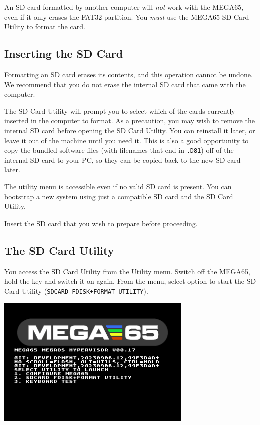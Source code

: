 An SD card formatted by another computer will {\em not} work with the MEGA65, even if it only erases the FAT32 partition. You {\em must} use the MEGA65 SD Card Utility to format the card.

\subsection{Inserting the SD Card}

Formatting an SD card erases its contents, and this operation cannot be undone. We recommend that you do not erase the internal SD card that came with the computer.

The SD Card Utility will prompt you to select which of the cards currently inserted in the computer to format. As a precaution, you may wish to remove the internal SD card before opening the SD Card Utility. You can reinstall it later, or leave it out of the machine until you need it. This is also a good opportunity to copy the bundled software files (with filenames that end in {\tt .D81}) off of the internal SD card to your PC, so they can be copied back to the new SD card later.

The utility menu is accessible even if no valid SD card is present. You can bootstrap a new system using just a compatible SD card and the SD Card Utility.

Insert the SD card that you wish to prepare before proceeding.

\subsection{The SD Card Utility}

You access the SD Card Utility from the Utility menu. Switch off the MEGA65, hold the  key and switch it on again. From the menu, select option  to start the SD Card Utility (\texttt{SDCARD FDISK+FORMAT UTILITY}).

\begin{center}
\includegraphics[width=0.7\textwidth]{images/ss-utilmenu.png}
\end{center}

